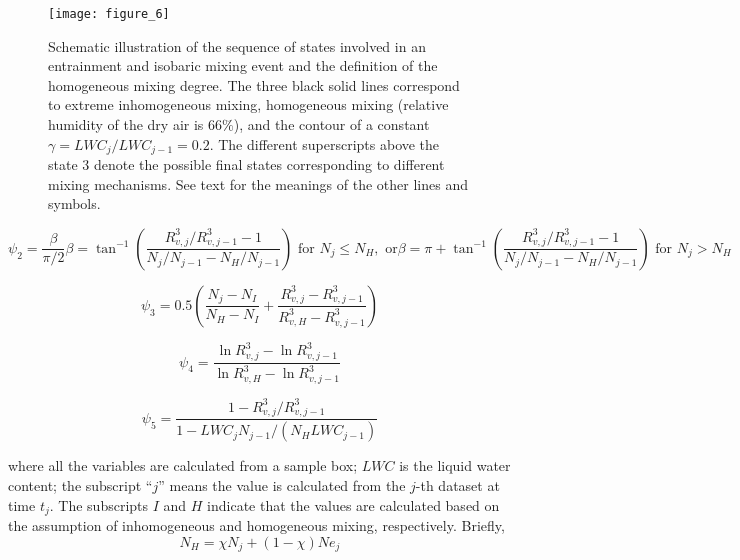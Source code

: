 \documentclass[draft,linenumbers]{agujournal}
\begin{document}
\begin{figure}
\centering
\texttt{[image: figure\_6]}
\caption{Schematic illustration of the sequence of states involved in an entrainment and isobaric mixing event and the definition of the homogeneous mixing degree. The three black solid lines correspond to extreme inhomogeneous mixing, homogeneous mixing (relative humidity of the dry air is $66\%$), and the contour of a constant $\gamma = LWC_j/LWC_{j-1} = 0.2$. The different superscripts above the state $3$ denote the possible final states corresponding to different mixing mechanisms. See text for the meanings of the other lines and symbols. \label{fig:rn_dia}}
\end{figure}
  
\begin{subequations}
\begin{equation}
\psi_2 = \frac{\beta}{\pi/2}
\label{phi2}
\end{equation}

\begin{equation}
\beta = \tan^{-1}(\frac{R_{v,j}^3/R_{v,j-1}^3 - 1}{N_j/N_{j-1} - N_H/N_{j-1}}) \text{ for } N_j \leq N_H, \text{ or}
\end{equation}

\begin{equation}
\beta = \pi + \tan^{-1}(\frac{R_{v,j}^3/R_{v,j-1}^3 - 1}{N_j/N_{j-1} - N_H/N_{j-1}})  \text{ for } N_j > N_H
\end{equation}
\end{subequations}

\begin{equation}
\psi_3 = 0.5(\frac{N_j-N_{I}}{N_H-N_I} + \frac{R_{v,j}^3-R_{v,j-1}^3}{R_{v,H}^3 - R_{v,j-1}^3})
\label{phi3}
\end{equation}

\begin{equation}
\psi_4 = \frac{\ln R_{v,j}^3 - \ln R_{v,j-1}^3}{\ln R_{v,H}^3 - \ln R_{v,j-1}^3}
\label{phi4}
\end{equation}

\begin{equation}
\psi_5 = \frac{1 - R_{v,j}^3/R_{v,j-1}^3}{1 - LWC_{j}N_{j-1}/(N_H LWC_{j-1})}
\label{phi5}
\end{equation}

where all the variables are calculated from a sample box; $LWC$ is the liquid water content; the subscript ``$j$'' means the value is calculated from the $j$-th dataset at time $t_j$. The subscripts $I$ and $H$ indicate that the values are calculated based on the assumption of inhomogeneous and homogeneous mixing, respectively. Briefly,
\begin{equation}
N_H = \chi N_j + (1 - \chi) Ne_j
\end{equation}
\end{document}
